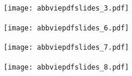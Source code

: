 \documentclass[t]{beamer}
\begin{document}
\begin{frame}
\centering
\begin{figure}
\begin{center}
\texttt{[image: abbviepdfslides\_3.pdf]}
\end{center}
\end{figure}
\end{frame}

\begin{frame}
\centering
\begin{figure}
\begin{center}
\texttt{[image: abbviepdfslides\_6.pdf]}
\end{center}
\end{figure}
\end{frame}
\begin{frame}
\centering
\begin{figure}
\begin{center}
\texttt{[image: abbviepdfslides\_7.pdf]}
\end{center}
\end{figure}
\end{frame}
\begin{frame}
\centering
\begin{figure}
\begin{center}
\texttt{[image: abbviepdfslides\_8.pdf]}
\end{center}
\end{figure}
\end{frame}
\end{document}
